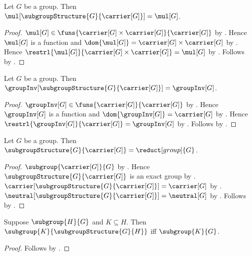 \begin{proposition}\label{full_subgroup_structure_mul}
    Let $G$ be a group.
    Then
        $\mul[\subgroupStructure{G}{\carrier[G]}]=\mul[G]$.
\end{proposition}
\begin{proof}
    $\mul[G]\in
        \funs{\carrier[G]\times\carrier[G]}{\carrier[G]}$ by
        .
    Hence $\mul[G]$ is a function and
        $\dom{\mul[G]}=\carrier[G]\times\carrier[G]$ by
        .
    Hence
        $\restrl{\mul[G]}{\carrier[G]\times\carrier[G]}
            =\mul[G]$ by .
    Follows by .
\end{proof}

\begin{proposition}\label{full_subgroup_structure_inv}
    Let $G$ be a group.
    Then
        $\groupInv[\subgroupStructure{G}{\carrier[G]}]
            =\groupInv[G]$.
\end{proposition}
\begin{proof}
    $\groupInv[G]\in\funs{\carrier[G]}{\carrier[G]}$ by
        .
    Hence $\groupInv[G]$ is a function and
        $\dom{\groupInv[G]}=\carrier[G]$ by .
    Hence $\restrl{\groupInv[G]}{\carrier[G]}=\groupInv[G]$ by
        .
    Follows by .
\end{proof}

\begin{theorem}\label{full_subgroup_structure_eq_group_reduct}
    Let $G$ be a group.
    Then
        $\subgroupStructure{G}{\carrier[G]}
            =\reduct[group]{G}$.
\end{theorem}
\begin{proof}
    $\subgroup{\carrier[G]}{G}$ by
        .
    Hence $\subgroupStructure{G}{\carrier[G]}$ is an exact group by
        .
    $\carrier[\subgroupStructure{G}{\carrier[G]}]
        =\carrier[G]$ by .
    $\neutral[\subgroupStructure{G}{\carrier[G]}]
        =\neutral[G]$ by .
    Follows by
        .
\end{proof}

\begin{theorem}\label{subgroup_of_induced_group_iff}
    Suppose $\subgroup{H}{G}$ and $K\subseteq H$.
    Then
        $\subgroup{K}{\subgroupStructure{G}{H}}$ iff
        $\subgroup{K}{G}$.
\end{theorem}
\begin{proof}
    Follows by
        .
\end{proof}

